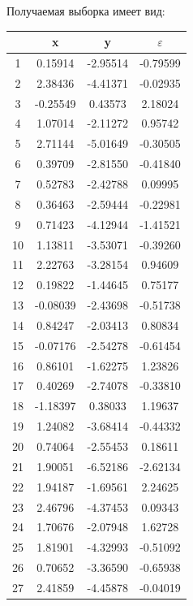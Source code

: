 \documentclass[14pt,a4paper]{scrartcl}
\begin{document}
Получаемая выборка имеет вид:
\clearpage
\begin{table}[ht]
	\centering
	\begin{tabular}{|c||c||c||c|}
		\hline
		& x & y & $\varepsilon$ \\ 
		\hline
		1 & 0.15914 & -2.95514 & -0.79599 \\ 
		\hline
		2 & 2.38436 & -4.41371 & -0.02935 \\ 
		\hline
		3 & -0.25549 & 0.43573 & 2.18024 \\ 
		\hline
		4 & 1.07014 & -2.11272 & 0.95742 \\ 
		\hline
		5 & 2.71144 & -5.01649 & -0.30505 \\ 
		\hline
		6 & 0.39709 & -2.81550 & -0.41840 \\ 
		\hline
		7 & 0.52783 & -2.42788 & 0.09995 \\ 
		\hline
		8 & 0.36463 & -2.59444 & -0.22981 \\ 
		\hline
		9 & 0.71423 & -4.12944 & -1.41521 \\ 
		\hline
		10 & 1.13811 & -3.53071 & -0.39260 \\ 
		\hline
		11 & 2.22763 & -3.28154 & 0.94609 \\ 
		\hline
		12 & 0.19822 & -1.44645 & 0.75177 \\ 
		\hline
		13 & -0.08039 & -2.43698 & -0.51738 \\ 
		\hline
		14 & 0.84247 & -2.03413 & 0.80834 \\ 
		\hline
		15 & -0.07176 & -2.54278 & -0.61454 \\ 
		\hline
		16 & 0.86101 & -1.62275 & 1.23826 \\ 
		\hline
		17 & 0.40269 & -2.74078 & -0.33810 \\ 
		\hline
		18 & -1.18397 & 0.38033 & 1.19637 \\ 
		\hline
		19 & 1.24082 & -3.68414 & -0.44332 \\ 
		\hline
		20 & 0.74064 & -2.55453 & 0.18611 \\ 
		\hline
		21 & 1.90051 & -6.52186 & -2.62134 \\ 
		\hline
		22 & 1.94187 & -1.69561 & 2.24625 \\ 
		\hline
		23 & 2.46796 & -4.37453 & 0.09343 \\ 
		\hline
		24 & 1.70676 & -2.07948 & 1.62728 \\ 
		\hline
		25 & 1.81901 & -4.32993 & -0.51092 \\ 
		\hline
		26 & 0.70652 & -3.36590 & -0.65938 \\ 
		\hline
		27 & 2.41859 & -4.45878 & -0.04019 \\ 

\end{tabular}
\end{table}
\end{document}
